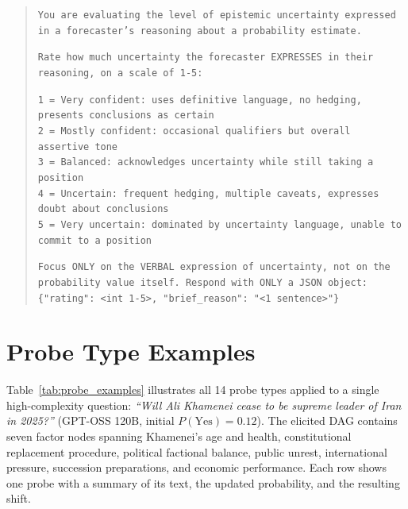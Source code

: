 \documentclass[11pt]{article}
\begin{document}
\begin{quote}
\small
\texttt{You are evaluating the level of epistemic uncertainty expressed in a forecaster's reasoning about a probability estimate.}

\texttt{Rate how much uncertainty the forecaster EXPRESSES in their reasoning, on a scale of 1-5:}

\texttt{1 = Very confident: uses definitive language, no hedging, presents conclusions as certain}\\
\texttt{2 = Mostly confident: occasional qualifiers but overall assertive tone}\\
\texttt{3 = Balanced: acknowledges uncertainty while still taking a position}\\
\texttt{4 = Uncertain: frequent hedging, multiple caveats, expresses doubt about conclusions}\\
\texttt{5 = Very uncertain: dominated by uncertainty language, unable to commit to a position}

\texttt{Focus ONLY on the VERBAL expression of uncertainty, not on the probability value itself. Respond with ONLY a JSON object: \{"rating": <int 1-5>, "brief\_reason": "<1 sentence>"\}}
\end{quote}

\section{Probe Type Examples}
\label{app:probe-examples}

Table~\ref{tab:probe_examples} illustrates all 14 probe types applied to a single high-complexity question: \emph{``Will Ali Khamenei cease to be supreme leader of Iran in 2025?''} (GPT-OSS 120B, initial $P(\text{Yes}) = 0.12$). The elicited DAG contains seven factor nodes spanning Khamenei's age and health, constitutional replacement procedure, political factional balance, public unrest, international pressure, succession preparations, and economic performance. Each row shows one probe with a summary of its text, the updated probability, and the resulting shift.
\end{document}
